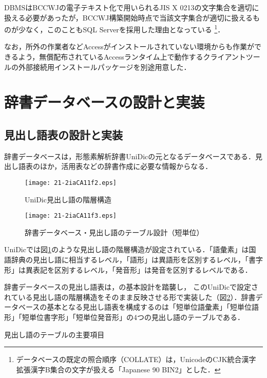 \documentclass[japanese]{jnlp_1.4}
\begin{document}
DBMSはBCCWJの電子テキスト化で用いられるJIS X 0213の文字集合\cite{山口ほか2011}を適切に扱える必要があったが，BCCWJ構築開始時点で当該文字集合が適切に扱えるものが少なく，このこともSQL Serverを採用した理由となっている \footnote{データベースの既定の照合順序（COLLATE）は，UnicodeのCJK統合漢字拡張漢字B集合の文字が扱える「Japanese 90 BIN2」とした．}．

なお，所外の作業者などAccessがインストールされていない環境からも作業ができるよう，無償配布されているAccessランタイム上で動作するクライアントツールの外部接続用インストールパッケージを別途用意した．


\section{辞書データベースの設計と実装}
\label{sec:dicdb}

\subsection{見出し語表の設計と実装}

辞書データベースは，形態素解析辞書UniDicの元となるデータベースである．見出し語表のほか，活用表などの辞書作成に必要な情報からなる．

\begin{figure}[p]
\begin{center}
\texttt{[image: 21-2iaCA11f2.eps]}
\end{center}
\caption{UniDic見出し語の階層構造}
\label{fig2}
\end{figure}
\begin{figure}[p]
\begin{center}
\texttt{[image: 21-2iaCA11f3.eps]}
\end{center}
\caption{辞書データベース・見出し語のテーブル設計（短単位）}
\label{fig3}
\end{figure}


UniDicでは図\ref{fig2}のような見出し語の階層構造が設定されている．「語彙素」は国語辞典の見出し語に相当するレベル，「語形」は異語形を区別するレベル，「書字形」は異表記を区別するレベル，「発音形」は発音を区別するレベルである．

辞書データベースの見出し語表は，の基本設計を踏襲し，
このUniDicで設定されている見出し語の階層構造をそのまま反映させる形で実装した（図\ref{fig3}）．辞書データベースの基本となる見出し語表を構成するのは「短単位語彙素」「短単位語形」「短単位書字形」「短単位発音形」の4つの見出し語のテーブルである．

\begin{table}[b]
\caption{見出し語のテーブルの主要項目}
\label{tab2}

\end{table}
\end{document}
